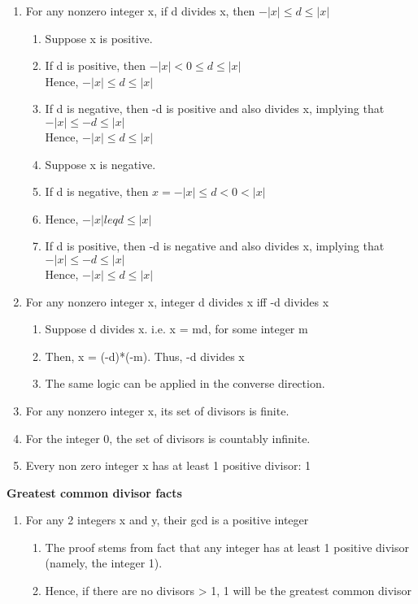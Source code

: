 \documentclass{article}
\begin{document}
\begin{enumerate}
\item For any nonzero integer x, if d divides x, then $ -|x| \leq d \leq |x| $
\begin{enumerate}
\item Suppose x is positive.
\item If d is positive, then $ -|x| < 0 \leq d \leq |x| $
\\ Hence, $ -|x| \leq d \leq |x| $
\item If d is negative, then -d is positive and also divides x, implying that $ -|x| \leq -d \leq |x| $
\\ Hence, $ -|x| \leq d \leq |x| $
\item Suppose x is negative.
\item If d is negative, then $ x = -|x| \leq d < 0 < |x| $
\item Hence, $ -|x| leq d \leq |x| $
\item If d is positive, then -d is negative and also divides x, implying that $
-|x| \leq -d \leq |x| $
\\ Hence, $ -|x| \leq d \leq |x| $
\end{enumerate}

\item For any nonzero integer x, integer d divides x iff -d divides x
\begin{enumerate}
\item Suppose d divides x. i.e. x = md, for some integer m
\item Then, x = (-d)*(-m). Thus, -d divides x
\item The same logic can be applied in the converse direction.
\end{enumerate}

\item For any nonzero integer x, its set of divisors is finite.
\item For the integer 0, the set of divisors is countably infinite.

\item Every non zero integer x has at least 1 positive divisor: 1
\end{enumerate}

\textbf{Greatest common divisor facts}

\begin{enumerate}
\item For any 2 integers x and y, their gcd is a positive integer
\begin{enumerate}
\item The proof stems from fact that any integer has at least 1 positive divisor (namely, the integer 1).
\item Hence, if there are no divisors > 1, 1 will be the greatest common divisor
\end{enumerate}
\end{enumerate}
\end{document}
